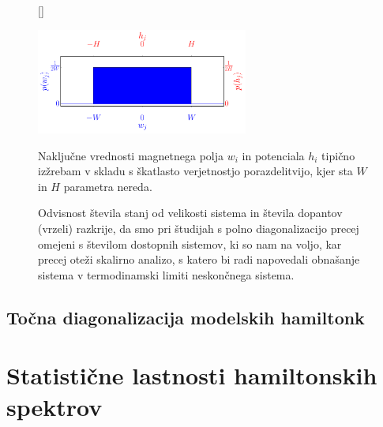 \begin{figure}[H]
[\FBwidth]
{\caption{Naključne vrednosti magnetnega polja $w_i$ in potenciala $h_i$ tipično izžrebam v skladu s škatlasto verjetnostjo porazdelitvijo, kjer sta $W$ in $H$ parametra nereda. }\label{fig:prob_dist}}
{\includegraphics[width=0.62\textwidth]{prob_dist.pdf}}
\end{figure}
\begin{figure}[H]
\caption{Odvisnost števila stanj od velikosti sistema in števila dopantov (vrzeli) razkrije, da smo pri študijah s polno diagonalizacijo precej omejeni s številom dostopnih sistemov, ki so nam na voljo, kar precej oteži skalirno analizo, s katero bi radi napovedali obnašanje sistema v termodinamski limiti neskončnega sistema.}
\label{fig:tJ_num_states}
\end{figure}

\section{Točna diagonalizacija modelskih hamiltonk}
\label{diagonalizacija_metoda}
\chapter{Statistične lastnosti hamiltonskih spektrov}
\label{statisticne_lastnosti}
